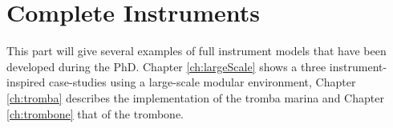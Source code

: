 \chapter*{Complete Instruments}
This part will give several examples of full instrument models that have been developed during the PhD. Chapter \ref{ch:largeScale} shows a three instrument-inspired case-studies using a large-scale modular environment, Chapter \ref{ch:tromba} describes the implementation of the tromba marina and Chapter \ref{ch:trombone} that of the trombone.